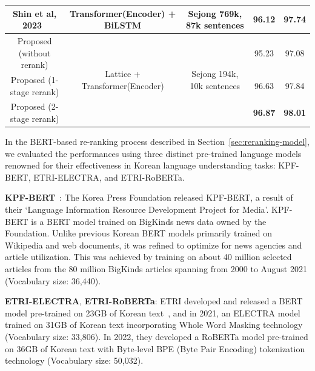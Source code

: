 \documentclass[AMS,STIX2COL]{WileyNJD-v2}
\begin{document}
\begin{table}[]
\begin{tabular*}{500pt}{@{\extracolsep\fill}ccc|cc@{\extracolsep\fill}}
            Shin et al, 2023~\cite{ShinHJ2023}    & Transformer(Encoder) + BiLSTM                   & Sejong 769k, 87k sentences                  & 96.12                      & 97.74                        \\
            \midrule
            Proposed (without rerank)             & \multirow{3}{*}{Lattice + Transformer(Encoder)} & \multirow{3}{*}{Sejong 194k, 10k sentences} & 95.23                      & 97.08                        \\
            Proposed (1-stage rerank)             & ~                                               & ~                                           & 96.63                      & 97.84                        \\
            Proposed (2-stage rerank)             & ~                                               & ~                                           & \textbf{96.87}             & \textbf{98.01}               \\
            \bottomrule
        \end{tabular*}
    \end{table}

    In the BERT-based re-ranking process described in Section~\ref{sec:reranking-model}, we evaluated the performances using three distinct pre-trained language models renowned for their effectiveness in Korean language understanding tasks: KPF-BERT, ETRI-ELECTRA, and ETRI-RoBERTa.

    \textbf{KPF-BERT}~\cite{KPF_BERT}: The Korea Press Foundation released KPF-BERT, a result of their `Language Information Resource Development Project for Media'.
    KPF-BERT is a BERT model trained on BigKinds news data owned by the Foundation.
    Unlike previous Korean BERT models primarily trained on Wikipedia and web documents, it was refined to optimize for news agencies and article utilization.
    This was achieved by training on about 40 million selected articles from the 80 million BigKinds articles spanning from 2000 to August 2021 (Vocabulary size: 36,440).

    \textbf{ETRI-ELECTRA}, \textbf{ETRI-RoBERTa}: ETRI developed and released a BERT model pre-trained on 23GB of Korean text~\cite{KorBERT}, and in 2021, an ELECTRA model trained on 31GB of Korean text incorporating Whole Word Masking technology (Vocabulary size: 33,806).
    In 2022, they developed a RoBERTa model pre-trained on 36GB of Korean text with Byte-level BPE (Byte Pair Encoding) tokenization technology (Vocabulary size: 50,032).
\end{document}
